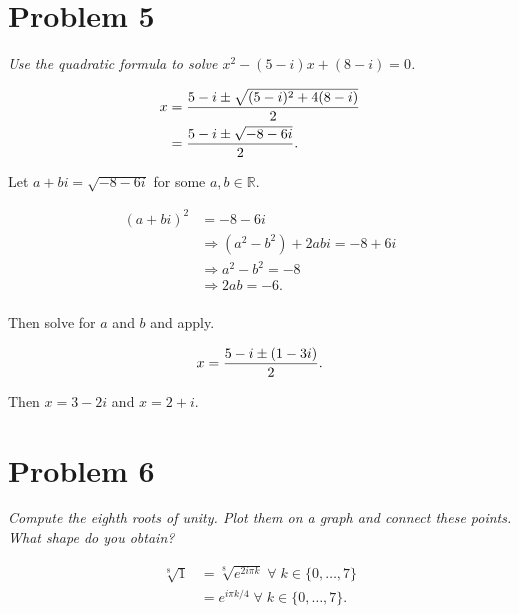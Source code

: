 \documentclass{tufte-handout}
\begin{document}
\section{Problem 5}

\emph{Use the quadratic formula to solve
  $x^2 - (5 - i)x + (8 - i) = 0$.}

\bigskip

\begin{align*}
  x &= {5 - i \pm \sqrt{(5 - i)^2 + 4(8 - i)} \over 2}\\
    &= {5 - i \pm \sqrt{-8 - 6i} \over 2}.\\
\end{align*}

Let $a + bi = \sqrt{-8 - 6i}$ for some $a, b \in \mathbb{R}$.

\begin{align*}
  {(a + bi)}^2 &= -8 - 6i\\
               &\Rightarrow (a^2 - b^2) + 2abi = -8 + 6i\\
               &\Rightarrow a^2 -b^2 = -8\\
               &\Rightarrow 2ab = -6.\\
\end{align*}

Then solve for $a$ and $b$ and apply.

\begin{align*}
  x &= {5 - i \pm (1 - 3i) \over 2}.\\
\end{align*}

Then $x = 3 - 2 i$ and $x = 2 + i$.

\section{Problem 6}

\emph{Compute the eighth roots of unity. Plot them on a graph and
  connect these points. What shape do you obtain?}

\bigskip

\begin{align*}
  \sqrt[8]{1} &= \sqrt[8]{e^{2 i \pi k}} \; \forall \; k \in
                \{0,\ldots,7\}\\
              &= e^{i \pi k/ 4} \; \forall \; k \in \{0,\ldots,7\}.\\
\end{align*}
\end{document}
